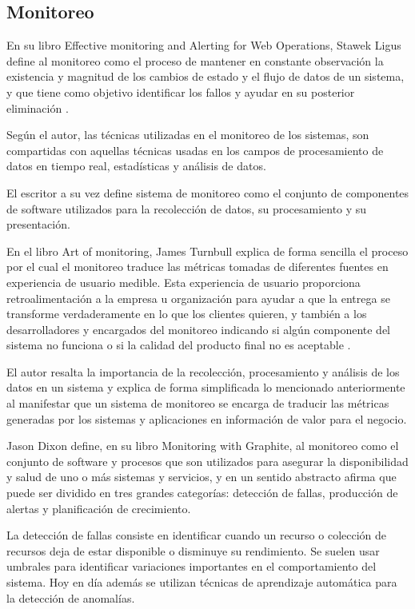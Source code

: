\subsection{Monitoreo}
\label{monitoreo}

En su libro Effective monitoring and Alerting for Web Operations, Stawek Ligus
define al monitoreo como el proceso de mantener en constante observación la
existencia y magnitud de los cambios de estado y el flujo de datos de un
sistema, y que tiene como objetivo identificar los fallos y ayudar en su
posterior eliminación \cite[p.~2]{monitoreo:efective_monitoring_and_alerting}.

Según el autor, las técnicas utilizadas en el monitoreo de los sistemas, son
compartidas con aquellas técnicas usadas en los campos de procesamiento de
datos en tiempo real, estadísticas y análisis de datos.

El escritor a su vez define sistema de monitoreo como el conjunto de
componentes de software utilizados para la recolección de datos, su
procesamiento y su presentación.

En el libro Art of monitoring, James Turnbull explica de forma sencilla el
proceso por el cual el monitoreo traduce las métricas tomadas de diferentes
fuentes en experiencia de usuario medible. Esta experiencia de usuario
proporciona retroalimentación a la empresa u organización para ayudar a que la
entrega se transforme verdaderamente en lo que los clientes quieren, y también
a los desarrolladores y encargados del monitoreo indicando si algún componente
del sistema no funciona o si la calidad del producto final no es aceptable
\cite[p.~8]{monitoreo:art_of_monitoring}.

El autor resalta la importancia de la recolección, procesamiento y análisis de
los datos en un sistema y explica de forma simplificada lo mencionado
anteriormente al manifestar que un sistema de monitoreo se encarga de traducir
las métricas generadas por los sistemas y aplicaciones en información de valor
para el negocio.

Jason Dixon define, en su libro Monitoring with Graphite, al monitoreo como el
conjunto de software y procesos que son utilizados para asegurar la
disponibilidad y salud de uno o más sistemas y servicios, y en un sentido
abstracto afirma que puede ser dividido en tres grandes categorías: detección
de fallas, producción de alertas y planificación de crecimiento.

La detección de fallas consiste en identificar cuando un recurso o colección de
recursos deja de estar disponible o disminuye su rendimiento. Se suelen usar
umbrales para identificar variaciones importantes en el comportamiento del
sistema. Hoy en día además se utilizan técnicas de aprendizaje automática para
la detección de anomalías.

